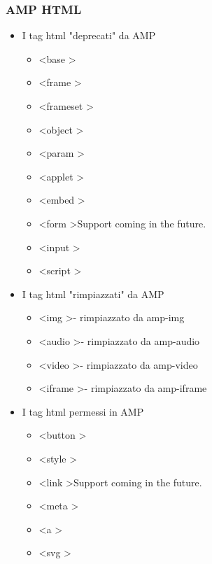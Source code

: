 \documentclass[a4paper]{article}
\begin{document}
\subsubsection{AMP HTML}
    \begin{itemize}
        \item I tag html "deprecati" da AMP
        \begin{itemize}
            \item \textless base \textgreater
            \item \textless frame \textgreater
            \item \textless frameset \textgreater
            \item \textless object \textgreater
            \item \textless param \textgreater
            \item \textless applet \textgreater
            \item \textless embed \textgreater
            \item \textless form \textgreater Support coming in the future.
            \item \textless input \textgreater
            \item \textless script \textgreater
        \end{itemize}
        \item I tag html "rimpiazzati" da AMP
        \begin{itemize}
            \item \textless img \textgreater - rimpiazzato da amp-img
            \item \textless audio \textgreater - rimpiazzato da amp-audio
            \item \textless video \textgreater - rimpiazzato da amp-video
            \item \textless iframe \textgreater - rimpiazzato da amp-iframe
        \end{itemize}
        \item I tag html permessi in  AMP
        \begin{itemize}
            \item \textless button \textgreater
            \item \textless style \textgreater
            \item \textless link \textgreater Support coming in the future.
            \item \textless meta \textgreater
            \item \textless a \textgreater
            \item \textless svg \textgreater
        \end{itemize}
    \end{itemize}
\end{document}
